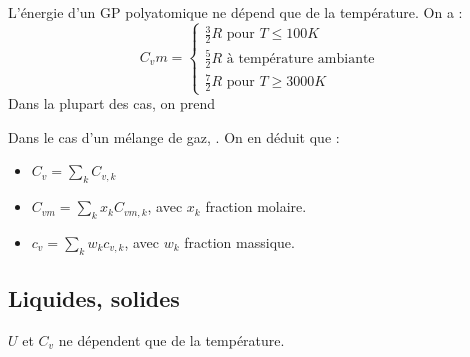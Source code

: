 \documentclass[12pt]{article}
\theoremstyle{cstyle}{\newtheorem{definition}{Définition}[section]}
\theoremstyle{cstyle}{\newtheorem{proposition}[definition]{Propriété}}
\theoremstyle{cstyle}{\newtheorem{theorem}[definition]{Théorème}}
\theoremstyle{mystyle}{\newtheorem{lemma}[definition]{Lemme}}
\theoremstyle{mystyle}{\newtheorem{corollary}[definition]{Corollaire}}
\theoremstyle{mystyle}{\newtheorem*{remark}{Remarque}}
\theoremstyle{mystyle}{\newtheorem*{remarks}{Remarques}}
\theoremstyle{mystyle}{\newtheorem*{example}{Exemple}}
\theoremstyle{mystyle}{\newtheorem*{examples}{Exemples}}
\theoremstyle{definition}{\newtheorem*{exercise}{Exercice}}
\theoremstyle{mystyle}{\newtheorem*{methode}{Méthode}}
\theoremstyle{cstyle}{\newtheorem*{cthm}{}}
\theoremstyle{warn}
\begin{document}
	\newpage
	\begin{minipage}[t]{0.45\textwidth}
		\begin{proposition}
			L'énergie d'un GP polyatomique ne dépend que de la température.
			On a :
			\[
			C_vm = \begin{cases}
				\frac{3}{2}R \text{ pour } T \leqslant 100K \\
				\frac{5}{2}R \text{ à température ambiante} \\
				\frac{7}{2}R \text{ pour } T \geq 3000K
			\end{cases}
			\]
			Dans la plupart des cas, on prend 
		\end{proposition}
	
		\begin{proposition}
			Dans le cas d'un mélange de gaz, .
			On en déduit que :
			\begin{itemize}
				\item \(C_v = \sum_k C_{v,k}\)
				\item \(C_{vm} = \sum_k x_k C_{vm,k}\), avec \(x_k\) fraction molaire.
				\item \(c_{v} = \sum_k w_k c_{v,k}\), avec \(w_k\) fraction massique.
			\end{itemize}
		\end{proposition}
	
		\subsection{Liquides, solides}
		
		\begin{proposition}
			\(U\) et \(C_v\) ne dépendent que de la température.
		\end{proposition}
	\end{minipage}
	\hfill
	\vrule
	\hfill
\end{document}
